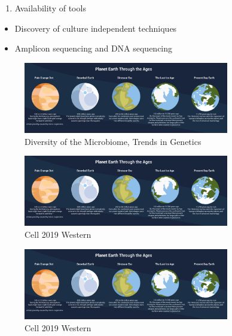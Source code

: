 \documentclass[
]{book}
\providecommand{\tightlist}{%
  \setlength{\itemsep}{0pt}\setlength{\parskip}{0pt}}
\begin{document}
\begin{enumerate}
\def\labelenumi{\arabic{enumi}.}
\setcounter{enumi}{1}
\tightlist
\item
  Availability of tools
\end{enumerate}

\begin{itemize}
\tightlist
\item
  Discovery of culture independent techniques
\item
  Amplicon sequencing and DNA sequencing
\end{itemize}

\begin{figure}
\centering
\includegraphics[width=0.8\textwidth,height=\textheight]{./Figures/Planets.png}
\caption{Diversity of the Microbiome, Trends in Genetics}
\end{figure}

\begin{figure}
\centering
\includegraphics[width=0.8\textwidth,height=\textheight]{./Figures/Planets.png}
\caption{Cell 2019 Western}
\end{figure}

\begin{figure}
\centering
\includegraphics[width=0.8\textwidth,height=\textheight]{./Figures/Planets.png}
\caption{Cell 2019 Western}
\end{figure}
\end{document}
